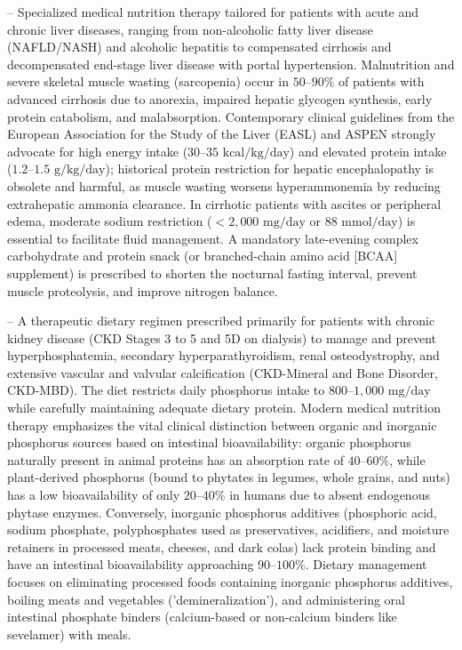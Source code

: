 -- Specialized medical nutrition therapy tailored for patients with acute and chronic liver diseases, ranging from non-alcoholic fatty liver disease (NAFLD/NASH) and alcoholic hepatitis to compensated cirrhosis and decompensated end-stage liver disease with portal hypertension. Malnutrition and severe skeletal muscle wasting (sarcopenia) occur in $50\text{--}90\%$ of patients with advanced cirrhosis due to anorexia, impaired hepatic glycogen synthesis, early protein catabolism, and malabsorption. Contemporary clinical guidelines from the European Association for the Study of the Liver (EASL) and ASPEN strongly advocate for high energy intake ($30\text{--}35\text{ kcal/kg/day}$) and elevated protein intake ($1.2\text{--}1.5\text{ g/kg/day}$); historical protein restriction for hepatic encephalopathy is obsolete and harmful, as muscle wasting worsens hyperammonemia by reducing extrahepatic ammonia clearance. In cirrhotic patients with ascites or peripheral edema, moderate sodium restriction ($<2{,}000\text{ mg/day}$ or $88\text{ mmol/day}$) is essential to facilitate fluid management. A mandatory late-evening complex carbohydrate and protein snack (or branched-chain amino acid [BCAA] supplement) is prescribed to shorten the nocturnal fasting interval, prevent muscle proteolysis, and improve nitrogen balance.

-- A therapeutic dietary regimen prescribed primarily for patients with chronic kidney disease (CKD Stages 3 to 5 and 5D on dialysis) to manage and prevent hyperphosphatemia, secondary hyperparathyroidism, renal osteodystrophy, and extensive vascular and valvular calcification (CKD-Mineral and Bone Disorder, CKD-MBD). The diet restricts daily phosphorus intake to $800\text{--}1{,}000\text{ mg/day}$ while carefully maintaining adequate dietary protein. Modern medical nutrition therapy emphasizes the vital clinical distinction between organic and inorganic phosphorus sources based on intestinal bioavailability: organic phosphorus naturally present in animal proteins has an absorption rate of $40\text{--}60\%$, while plant-derived phosphorus (bound to phytates in legumes, whole grains, and nuts) has a low bioavailability of only $20\text{--}40\%$ in humans due to absent endogenous phytase enzymes. Conversely, inorganic phosphorus additives (phosphoric acid, sodium phosphate, polyphosphates used as preservatives, acidifiers, and moisture retainers in processed meats, cheeses, and dark colas) lack protein binding and have an intestinal bioavailability approaching $90\text{--}100\%$. Dietary management focuses on eliminating processed foods containing inorganic phosphorus additives, boiling meats and vegetables ('demineralization'), and administering oral intestinal phosphate binders (calcium-based or non-calcium binders like sevelamer) with meals.

